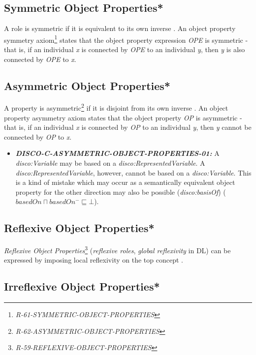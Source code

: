 \documentclass{llncs}
\newcommand{\ms}[1]{\texttt{#1}}
\begin{document}
\subsection{Symmetric Object Properties*}

A role is symmetric if it is equivalent to its own inverse \cite{Kroetzsch2012}.
An object property symmetry axiom\footnote{\emph{R-61-SYMMETRIC-OBJECT-PROPERTIES}} states that the object property expression \emph{OPE} is symmetric - that is, if an individual \emph{x} is connected by \emph{OPE} to an individual \emph{y}, then \emph{y} is also connected by \emph{OPE} to \emph{x}. 	

\subsection{Asymmetric Object Properties*}

A property is asymmetric\footnote{{\em R-62-ASYMMETRIC-OBJECT-PROPERTIES}} if it is disjoint from its own inverse \cite{Kroetzsch2012}.
An object property asymmetry axiom states that the object property \emph{OP} is asymmetric - that is, if an individual \emph{x} is connected by \emph{OP} to an individual \emph{y}, then \emph{y} cannot be connected by \emph{OP} to \emph{x}. 

\begin{itemize}
	\item \textbf{{\em DISCO-C-ASYMMETRIC-OBJECT-PROPERTIES-01:}} 
A {\em disco:Variable} may be based on a {\em disco:RepresentedVariable}.
A {\em disco:RepresentedVariable}, however, cannot be based on a {\em disco:Variable}.
This is a kind of mistake which may occur as a semantically equivalent object property for the other direction may also be possible ({\em disco:basisOf}) (\ms{$basedOn \sqcap basedOn^{-} \sqsubseteq \bot$}).
\end{itemize}

\subsection{Reflexive Object Properties*}

\emph{Reflexive Object Properties}\footnote{\emph{R-59-REFLEXIVE-OBJECT-PROPERTIES}} (\emph{reflexive roles}, \emph{global reflexivity} in DL) can be expressed by imposing local reflexivity on the top concept \cite{Kroetzsch2012}.

\subsection{Irreflexive Object Properties*}
\end{document}
